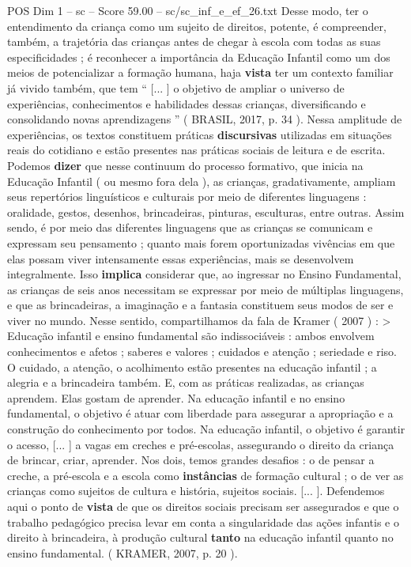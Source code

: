 \begin{textsample}{POS Dim 1 – sc – Score 59.00 – sc/sc\_inf\_e\_ef\_26.txt}
Desse modo, ter o entendimento da criança como um sujeito de direitos, potente, é compreender, também, a trajetória das crianças antes de chegar à escola com todas as suas especificidades ; é reconhecer a importância da Educação Infantil como um dos meios de potencializar a formação humana, haja \textbf{vista} ter um contexto familiar já vivido também, que tem “ [... ] o objetivo de ampliar o universo de experiências, conhecimentos e habilidades dessas crianças, diversificando e consolidando novas aprendizagens ” ( BRASIL, 2017, p. 34 ).
Nessa amplitude de experiências, os textos constituem práticas \textbf{discursivas} utilizadas em situações reais do cotidiano e estão presentes nas práticas sociais de leitura e de escrita.
Podemos \textbf{dizer} que nesse continuum do processo formativo, que inicia na Educação Infantil ( ou mesmo fora dela ), as crianças, gradativamente, ampliam seus repertórios linguísticos e culturais por meio de diferentes linguagens : oralidade, gestos, desenhos, brincadeiras, pinturas, esculturas, entre outras.
Assim sendo, é por meio das diferentes linguagens que as crianças se comunicam e expressam seu pensamento ; quanto mais forem oportunizadas vivências em que elas possam viver intensamente essas experiências, mais se desenvolvem integralmente.
Isso \textbf{implica} considerar que, ao ingressar no Ensino Fundamental, as crianças de seis anos necessitam se expressar por meio de múltiplas linguagens, e que as brincadeiras, a imaginação e a fantasia constituem seus modos de ser e viver no mundo.
Nesse sentido, compartilhamos da fala de Kramer ( 2007 ) : > Educação infantil e ensino fundamental são indissociáveis : ambos envolvem conhecimentos e afetos ; saberes e valores ; cuidados e atenção ; seriedade e riso.
O cuidado, a atenção, o acolhimento estão presentes na educação infantil ; a alegria e a brincadeira também.
E, com as práticas realizadas, as crianças aprendem.
Elas gostam de aprender.
Na educação infantil e no ensino fundamental, o objetivo é atuar com liberdade para assegurar a apropriação e a construção do conhecimento por todos.
Na educação infantil, o objetivo é garantir o acesso, [... ] a vagas em creches e pré-escolas, assegurando o direito da criança de brincar, criar, aprender.
Nos dois, temos grandes desafios : o de pensar a creche, a pré-escola e a escola como \textbf{instâncias} de formação cultural ; o de ver as crianças como sujeitos de cultura e história, sujeitos sociais. [... ].
Defendemos aqui o ponto de \textbf{vista} de que os direitos sociais precisam ser assegurados e que o trabalho pedagógico precisa levar em conta a singularidade das ações infantis e o direito à brincadeira, à produção cultural \textbf{tanto} na educação infantil quanto no ensino fundamental. ( KRAMER, 2007, p. 20 ).

\end{textsample}
